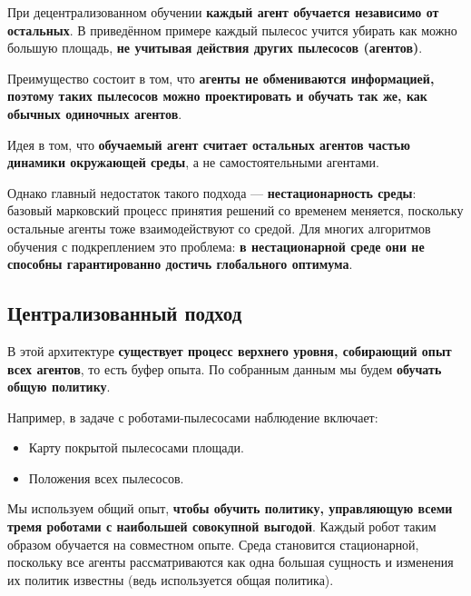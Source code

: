 \documentclass[11pt,a4paper]{article}
\begin{document}
При децентрализованном обучении \textbf{каждый агент обучается независимо от остальных}. В приведённом примере каждый пылесос учится убирать как можно большую площадь, \textbf{не учитывая действия других пылесосов (агентов)}.

Преимущество состоит в том, что \textbf{агенты не обмениваются информацией, поэтому таких пылесосов можно проектировать и обучать так же, как обычных одиночных агентов}.

Идея в том, что \textbf{обучаемый агент считает остальных агентов частью динамики окружающей среды}, а не самостоятельными агентами.

Однако главный недостаток такого подхода --- \textbf{нестационарность среды}: базовый марковский процесс принятия решений со временем меняется, поскольку остальные агенты тоже взаимодействуют со средой. Для многих алгоритмов обучения с подкреплением это проблема: \textbf{в нестационарной среде они не способны гарантированно достичь глобального оптимума}.

\subsection{Централизованный подход}\label{centralized-approach}


В этой архитектуре \textbf{существует процесс верхнего уровня, собирающий опыт всех агентов}, то есть буфер опыта. По собранным данным мы будем \textbf{обучать общую политику}.

Например, в задаче с роботами-пылесосами наблюдение включает:

\begin{itemize}
\tightlist
\item
  Карту покрытой пылесосами площади.
\item
  Положения всех пылесосов.
\end{itemize}

Мы используем общий опыт, \textbf{чтобы обучить политику, управляющую всеми тремя роботами с наибольшей совокупной выгодой}. Каждый робот таким образом обучается на совместном опыте. Среда становится стационарной, поскольку все агенты рассматриваются как одна большая сущность и изменения их политик известны (ведь используется общая политика).
\end{document}
